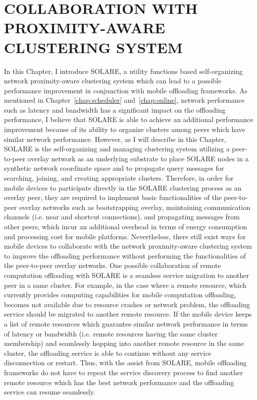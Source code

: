 \chapter{COLLABORATION WITH PROXIMITY-AWARE CLUSTERING SYSTEM}
\label{chap:solare}
In this Chapter, I introduce SOLARE, a utility functions based
self-organizing network proximity-aware clustering system which can
lead to a possible performance improvement in conjunction with mobile
offloading frameworks.
%
As mentioned in Chapter~\ref{chap:scheduler} and~\ref{chap:online},
network performance such as latency and bandwidth has a significant
impact on the offloading performance, I believe that SOLARE is able to
achieve an additional performance improvement because of its ability to
organize clusters among peers which have similar network performance. 
%
However, as I will describe in this Chapter, SOLARE is the self-organizing and
managing clustering system utilizing a peer-to-peer overlay network as
an underlying substrate to place SOLARE nodes in a synthetic network
coordinate space and to propagate query messages for searching, joining,
and creating appropriate clusters.
%
Therefore, in order for mobile devices to participate directly in the SOLARE
clustering process as an overlay peer, they are required to implement basic 
functionalities of the peer-to-peer overlay networks such as
bootstrapping overlay, maintaining communication channels (i.e. near and
shortcut connections), and propagating messages from other peers, which incur an
additional overhead in terms of energy consumption and processing cost
for mobile platforms.
%
Nevertheless, there still exist ways for mobile devices to collaborate with
the network proximity-aware clustering system to improve the offloading
performance without performing the functionalities of the peer-to-peer
overlay networks. 
%
One possible collaboration of remote computation offloading with SOLARE
is a seamless service migration to another peer in a same cluster.
%
For example, in the case where a remote resource, which currently
provides computing capabilities for mobile computation offloading,
becomes not available due to resource crashes or network problem, the
offloading service should be migrated to another remote resource.
%
If the mobile device keeps a list of remote resources which guarantee
similar network performance in terms of latency or bandwidth (i.e.
remote resources having the same cluster membership) and seamlessly
hopping into another remote resource in the same cluster, the offloading
service is able to continue without any service disconnection or restart.
%
Thus, with the assist from SOLARE, mobile offloading frameworks do not
have to repeat the service discovery process to find another remote
resource which has the best network performance and the offloading
service can resume seamlessly.
%
